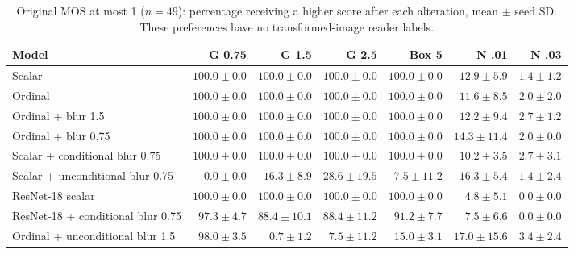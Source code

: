 \begin{table}[ht]\centering\scriptsize
\caption{Original MOS at most 1 ($n=49$): percentage receiving a higher score after each alteration, mean $\pm$ seed SD. These preferences have no transformed-image reader labels.}
\begin{tabular}{lrrrrrr}\toprule Model & G 0.75 & G 1.5 & G 2.5 & Box 5 & N .01 & N .03 \\ \midrule
Scalar & $100.0\pm0.0$ & $100.0\pm0.0$ & $100.0\pm0.0$ & $100.0\pm0.0$ & $12.9\pm5.9$ & $1.4\pm1.2$ \\
Ordinal & $100.0\pm0.0$ & $100.0\pm0.0$ & $100.0\pm0.0$ & $100.0\pm0.0$ & $11.6\pm8.5$ & $2.0\pm2.0$ \\
Ordinal + blur 1.5 & $100.0\pm0.0$ & $100.0\pm0.0$ & $100.0\pm0.0$ & $100.0\pm0.0$ & $12.2\pm9.4$ & $2.7\pm1.2$ \\
Ordinal + blur 0.75 & $100.0\pm0.0$ & $100.0\pm0.0$ & $100.0\pm0.0$ & $100.0\pm0.0$ & $14.3\pm11.4$ & $2.0\pm0.0$ \\
Scalar + conditional blur 0.75 & $100.0\pm0.0$ & $100.0\pm0.0$ & $100.0\pm0.0$ & $100.0\pm0.0$ & $10.2\pm3.5$ & $2.7\pm3.1$ \\
Scalar + unconditional blur 0.75 & $0.0\pm0.0$ & $16.3\pm8.9$ & $28.6\pm19.5$ & $7.5\pm11.2$ & $16.3\pm5.4$ & $1.4\pm2.4$ \\
ResNet-18 scalar & $100.0\pm0.0$ & $100.0\pm0.0$ & $100.0\pm0.0$ & $100.0\pm0.0$ & $4.8\pm5.1$ & $0.0\pm0.0$ \\
ResNet-18 + conditional blur 0.75 & $97.3\pm4.7$ & $88.4\pm10.1$ & $88.4\pm11.2$ & $91.2\pm7.7$ & $7.5\pm6.6$ & $0.0\pm0.0$ \\
Ordinal + unconditional blur 1.5 & $98.0\pm3.5$ & $0.7\pm1.2$ & $7.5\pm11.2$ & $15.0\pm3.1$ & $17.0\pm15.6$ & $3.4\pm2.4$ \\
\bottomrule\end{tabular}\end{table}
